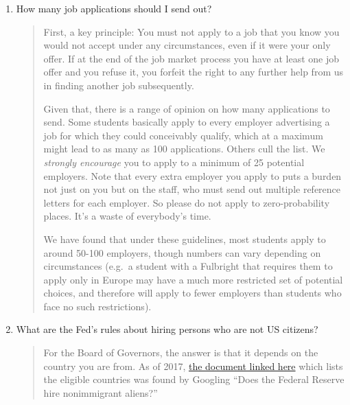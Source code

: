 \documentclass{\classes/econtex}
\providecommand\phantomsection{}
\begin{document}
\begin{enumerate}
\begin{quote}
  \end{quote}
\item  {} 
  How many job applications should I send out?

  \begin{quote}
    First, a key principle: You must not apply to a job that you know you would not
    accept under any circumstances, even if it were your only offer.  If
    at the end of the job market process you have at least one job offer
    and you refuse it, you forfeit the right to any further help from us
    in finding another job subsequently.  %

    Given that, there is a range of opinion on how many applications to send.  Some students basically apply to every employer advertising a job for which they could conceivably qualify, which at a maximum might lead to as many as 100 applications.  Others cull the list.  We \textit{strongly encourage} you to apply to a minimum of 25 potential employers.  Note that every extra employer you apply to puts a burden not just on you but on the staff, who must send out multiple reference letters for each employer.  So please do not apply to zero-probability places.  It's a waste of everybody's time.

    We have found that under these guidelines, most students apply to around
    50-100 employers, though numbers can vary depending on circumstances 
    (e.g.\ a student with a Fulbright that requires them to apply only in 
    Europe may have a much more restricted set of potential choices,
    and therefore will apply to fewer employers than students who face
    no such restrictions).


    \ifdvi\phantomsection\hypertarget{FedHiringRules}{}\fi

  \end{quote}
\item  {}  What are the Fed's rules about hiring persons who are not US citizens? 

  \begin{quote}
    For the Board of Governors, the answer is that it depends on the country you are from.  As of 2017, \href{https://www.federalreserve.gov/boarddocs/srletters/2006/SR0614a3.pdf}{the document linked here} which lists the eligible countries was found by Googling ``Does the Federal Reserve hire nonimmigrant aliens?'' 


\end{quote}
\end{enumerate}
\end{document}
